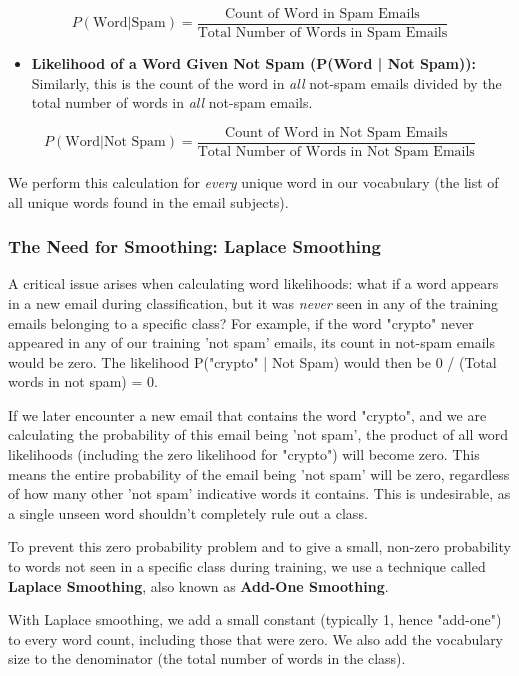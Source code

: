 \documentclass[12pt,a4paper]{article}
\begin{document}
\[P(\text{Word} | \text{Spam}) = \frac{\text{Count of Word in Spam Emails}}{\text{Total Number of Words in Spam Emails}}\]

\begin{itemize}
    \item \textbf{Likelihood of a Word Given Not Spam (P(Word | Not Spam)):} Similarly, this is the count of the word in \textit{all} not-spam emails divided by the total number of words in \textit{all} not-spam emails.
\end{itemize}

\[P(\text{Word} | \text{Not Spam}) = \frac{\text{Count of Word in Not Spam Emails}}{\text{Total Number of Words in Not Spam Emails}}\]

We perform this calculation for \textit{every} unique word in our vocabulary (the list of all unique words found in the email subjects).

\subsubsection{The Need for Smoothing: Laplace Smoothing}

A critical issue arises when calculating word likelihoods: what if a word appears in a new email during classification, but it was \textit{never} seen in any of the training emails belonging to a specific class? For example, if the word "crypto" never appeared in any of our training 'not spam' emails, its count in not-spam emails would be zero. The likelihood P("crypto" | Not Spam) would then be 0 / (Total words in not spam) = 0.

If we later encounter a new email that contains the word "crypto", and we are calculating the probability of this email being 'not spam', the product of all word likelihoods (including the zero likelihood for "crypto") will become zero. This means the entire probability of the email being 'not spam' will be zero, regardless of how many other 'not spam' indicative words it contains. This is undesirable, as a single unseen word shouldn't completely rule out a class.

To prevent this zero probability problem and to give a small, non-zero probability to words not seen in a specific class during training, we use a technique called \textbf{Laplace Smoothing}, also known as \textbf{Add-One Smoothing}.

With Laplace smoothing, we add a small constant (typically 1, hence "add-one") to every word count, including those that were zero. We also add the vocabulary size to the denominator (the total number of words in the class).
\end{document}
